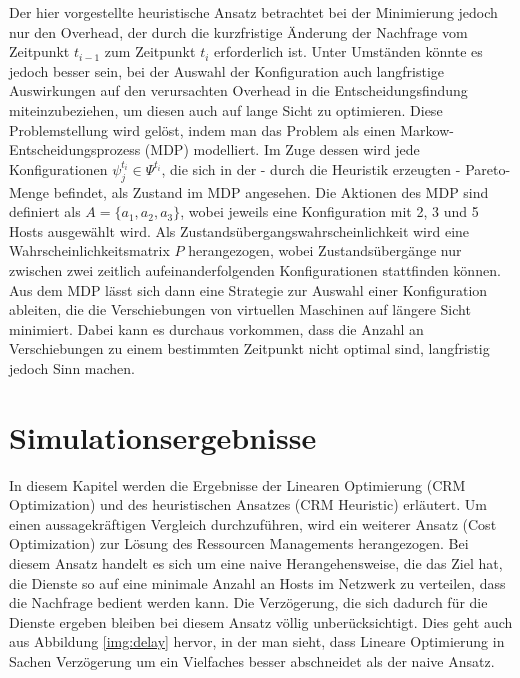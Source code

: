 \documentclass[conference]{IEEEtran}
\begin{document}
Der hier vorgestellte heuristische Ansatz betrachtet bei der Minimierung jedoch nur den Overhead, der durch die kurzfristige Änderung der Nachfrage vom Zeitpunkt \(t_{i-1}\) zum Zeitpunkt \(t_i\) erforderlich ist. Unter Umständen könnte es jedoch besser sein, bei der Auswahl der Konfiguration auch langfristige Auswirkungen auf den verursachten Overhead in die Entscheidungsfindung miteinzubeziehen, um diesen auch auf lange Sicht zu optimieren.
Diese Problemstellung wird gelöst, indem man das Problem als einen Markow-Entscheidungsprozess (MDP) modelliert. Im Zuge dessen wird jede Konfigurationen \(\psi_j^{t_i} \in \Psi^{t_i}\), die sich in der - durch die Heuristik erzeugten - Pareto-Menge befindet, als Zustand im MDP angesehen. Die Aktionen des MDP sind definiert als 
\(A=\{a_1,a_2,a_3\}\), wobei jeweils eine Konfiguration mit 2, 3 und 5 Hosts ausgewählt wird.  Als Zustandsübergangswahrscheinlichkeit wird eine Wahrscheinlichkeitsmatrix \(P\) herangezogen, wobei Zustandsübergänge nur zwischen zwei zeitlich aufeinanderfolgenden Konfigurationen stattfinden können.
Aus dem MDP lässt sich dann eine Strategie zur Auswahl einer Konfiguration ableiten, die die Verschiebungen von virtuellen Maschinen auf längere Sicht minimiert. Dabei kann es durchaus vorkommen, dass die Anzahl an Verschiebungen zu einem bestimmten Zeitpunkt nicht optimal sind, langfristig jedoch Sinn machen.


\section{Simulationsergebnisse}

In diesem Kapitel werden die Ergebnisse der Linearen Optimierung (CRM Optimization) und des heuristischen Ansatzes (CRM Heuristic) erläutert. Um einen aussagekräftigen Vergleich durchzuführen, wird ein weiterer Ansatz (Cost Optimization) zur Lösung des Ressourcen Managements herangezogen. Bei diesem Ansatz handelt es sich um eine naive Herangehensweise, die das Ziel hat, die Dienste so auf eine minimale Anzahl an Hosts im Netzwerk zu verteilen, dass die Nachfrage bedient werden kann. Die Verzögerung, die sich dadurch für die Dienste ergeben bleiben bei diesem Ansatz völlig unberücksichtigt. Dies geht auch aus Abbildung \ref{img:delay} hervor, in der man sieht, dass Lineare Optimierung in Sachen Verzögerung um ein Vielfaches besser abschneidet als der naive Ansatz.
\end{document}
